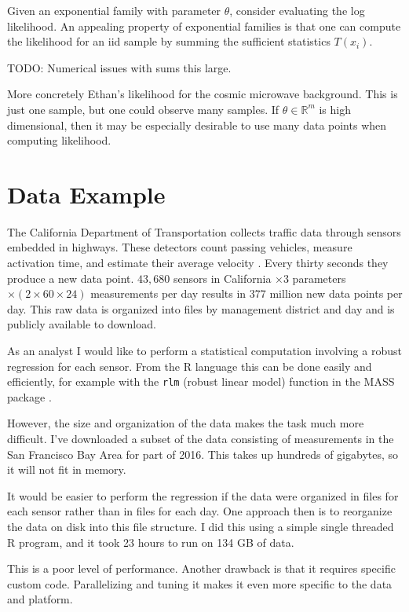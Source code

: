 \documentclass[12pt]{article}
\begin{document}
Given an exponential family with parameter $\theta$, consider evaluating
the log likelihood. An appealing property of exponential families is that
one can compute the likelihood for an iid sample by summing the
sufficient statistics $T(x_i)$.

TODO: Numerical issues with sums this large.

More concretely Ethan's likelihood for the cosmic microwave background. 
This is just one sample, but one could observe many samples.
If $\theta \in \mathbb{R}^m$ is high dimensional, then it may be
especially desirable to use many data points when computing likelihood.

\section{Data Example}

The California Department of Transportation collects traffic
data through sensors embedded in highways. These detectors count passing
vehicles, measure activation time, and estimate their average velocity \cite{jia2001pems}.
Every thirty seconds they produce a new data point. $43,680$ sensors in
California $\times 3$ parameters $\times (2 \times 60 \times 24)$
measurements per day results in 377 million new data points per day.
This raw data is organized into files by management district and day and is
publicly available to download.

As an analyst I would like to perform a statistical computation involving a
robust regression for each sensor. From the R language this can be done
easily and efficiently, for example with the \texttt{rlm} (robust linear
model) function in the MASS package \cite{venables2013modern}.

However, the size and organization of the data makes the task much more
difficult.  I've downloaded a subset of the data consisting of measurements
in the San Francisco Bay Area for part of 2016. This takes up hundreds of
gigabytes, so it will not fit in memory.

It would be easier to perform the regression if the data were
organized in files for each sensor rather than in files for each day.  One
approach then is to reorganize the data on disk into this file structure. I
did this using a simple single threaded R program, and it took 23 hours to
run on 134 GB of data.

This is a poor level of performance.  Another drawback is that it
requires specific custom code. Parallelizing and tuning it makes it even
more specific to the data and platform.
\end{document}
